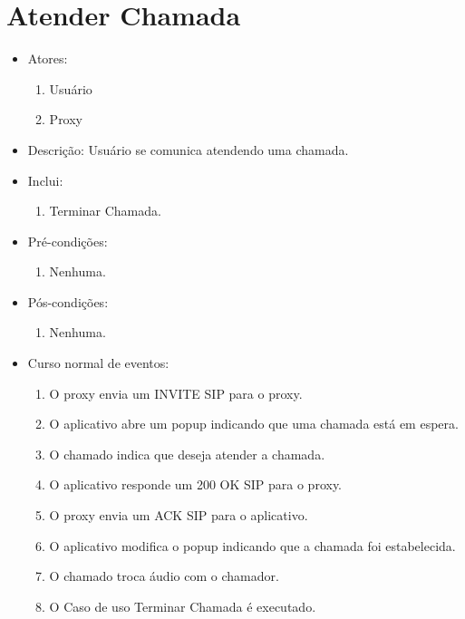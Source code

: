 \documentclass[12pt,a4paper]{article}
\begin{document}
\section{Atender Chamada}
\begin{itemize}
	\item Atores:
	\begin{enumerate}
		\item Usu\'{a}rio
		\item Proxy
	\end{enumerate}
	\item Descri\c{c}\~{a}o: Usu\'{a}rio se comunica atendendo uma chamada. 
	\item Inclui:
	\begin{enumerate}
        \item Terminar Chamada.
	\end{enumerate}
    \item Pr\'{e}-condi\c{c}\~{o}es:
	\begin{enumerate}
		\item Nenhuma.
	\end{enumerate}
	\item P\'{o}s-condi\c{c}\~{o}es:
	\begin{enumerate}
		\item Nenhuma.
	\end{enumerate}
	\item Curso normal de eventos:
	\begin{enumerate}
        \item O proxy envia um INVITE SIP para o proxy.
        \item O aplicativo abre um popup indicando que uma chamada est\'{a} em espera.
        \item O chamado indica que deseja atender a chamada.
        \item O aplicativo responde um 200 OK SIP para o proxy.
        \item O proxy envia um ACK SIP para o aplicativo.
        \item O aplicativo modifica o popup indicando que a chamada foi estabelecida.
        \item O chamado troca \'{a}udio com o chamador.
        \item O Caso de uso Terminar Chamada \'{e} executado.
	\end{enumerate}	
\end{itemize}
\end{document}
